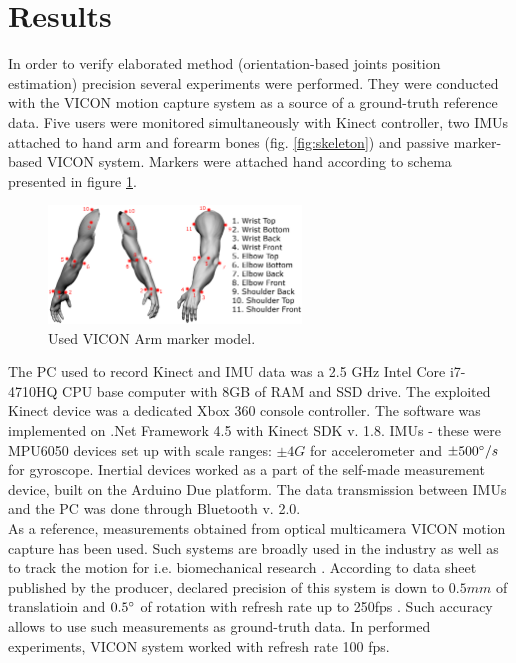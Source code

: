 \documentclass[9pt]{llncs}
\begin{document}
\section{Results}
In order to verify elaborated method (orientation-based joints position estimation) precision several experiments were performed. They were conducted with the VICON motion capture system as a source of a ground-truth reference data. Five users were monitored simultaneously with Kinect controller, two IMUs attached to hand arm and forearm bones (fig. \ref{fig:skeleton}) and passive marker-based VICON system. Markers were attached hand according to schema presented in figure \ref{fig:viconArm}.\\
\begin{figure}[H]
	\centering
	\includegraphics[width=0.6\textwidth]{Fig11.eps}
	\caption[VICON arm marker schema]{Used VICON Arm marker model.\footnotemark}
	\label{fig:viconArm}
\end{figure}
The PC used to record Kinect and IMU data was a 2.5 GHz Intel Core i7-4710HQ CPU base computer with 8GB of RAM and SSD drive. The exploited Kinect device was a dedicated Xbox 360 console controller. The software was implemented on .Net Framework 4.5 with Kinect SDK v. 1.8. IMUs - these were MPU6050 devices set up with scale ranges: $\pm 4G$ for accelerometer and $\pm 500\degree /s$ for gyroscope. Inertial devices worked as a part of the self-made measurement device, built on the Arduino Due platform. The data transmission between IMUs and the PC was done through Bluetooth v. 2.0.\\
As a reference, measurements obtained from optical multicamera VICON motion capture has been used. Such systems are broadly used in the industry as well as to track the motion for i.e. biomechanical research \cite{ViconCaseStudeis}. According to data sheet published by the producer, declared precision of this system is down to $0.5mm$ of translatioin and $0.5\degree$ of rotation with refresh rate up to 250fps \cite{Vicon2016}. Such accuracy allows to use such measurements as ground-truth data. In performed experiments, VICON system worked with refresh rate 100 fps.\\
\end{document}
